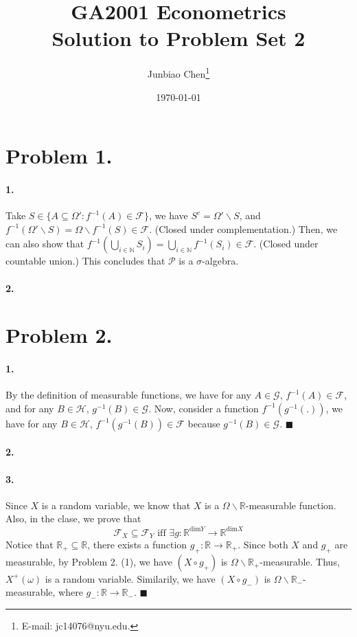 \documentclass[11pt]{article}
\title{GA2001 Econometrics \\Solution to Problem Set 2}
\author{
Junbiao Chen\thanks{E-mail: jc14076@nyu.edu.}
}
\date{\today}
\theoremstyle{definition}
\theoremstyle{boldtitle} %
\numberwithin{equation}{section}
\numberwithin{figure}{section}
\numberwithin{table}{section}
\begin{document}
\maketitle
\section*{Problem 1.}
\paragraph{1.} Take $S \in \{A \subseteq \Omega': f^{-1}(A) \in \mathcal{F}\}$,
we have $S^c = \Omega' \backslash S$, and $f^{-1} (\Omega'\backslash S) = \Omega \backslash f^{-1} (S) \in \mathcal{F}$. (Closed under complementation.)
Then, we can also show that 
$f^{-1}(\bigcup_{i \in \mathbb{N}} S_i) =  \bigcup_{i \in \mathbb{N}} f^{-1}(S_i) \in \mathcal{F}$. (Closed under countable union.)
This concludes that $\mathcal{P}$ is a $\sigma$-algebra.

\paragraph{2.}





\section*{Problem 2.} 
\paragraph{1.} By the definition of measurable functions, we have 
for any $A \in \mathcal{G}$, $f^{-1}(A) \in \mathcal{F}$, 
and for any $B \in \mathcal{H}$, $g^{-1}(B) \in \mathcal{G}$.
Now, consider a function $f^{-1}(g^{-1}(.))$, we have 
for any $B \in \mathcal{H}$, $f^{-1}(g^{-1}(B)) \in \mathcal{F}$ because $g^{-1}(B) \in \mathcal{G}$.
\(\blacksquare\)

\paragraph{2.}


\paragraph{3.} Since $X$ is a random variable, we know that $X$ is a $\Omega \backslash \mathbb{R}$-measurable function.
Also, in the clase, we prove that 
\[
\mathcal{F}_X \subseteq \mathcal{F}_Y \text{ iff } \exists g: \mathbb{R}^{\text{dim} Y} \rightarrow \mathbb{R}^{\text{dim} X}
\]
Notice that $\mathbb{R}_{+} \subseteq \mathbb{R}$, there exists a function $g_+: \mathbb{R} \rightarrow \mathbb{R}_{+}$.
Since both $X$ and $g_+$ are measurable, by Problem 2. (1), we have $(X \circ g_+)$ is $\Omega \backslash \mathbb{R}_+$-measurable.
Thus, $X^+(\omega)$ is a random variable.
Similarily, we have $(X \circ g_-)$ is $\Omega \backslash \mathbb{R}_-$-measurable, where $g_-: \mathbb{R} \rightarrow \mathbb{R}_-$.
\(\blacksquare\)
\end{document}
